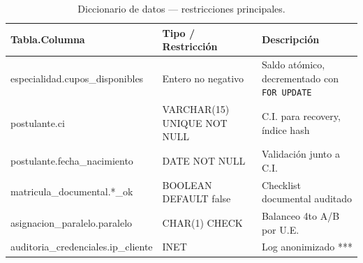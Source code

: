 \begin{table}[htbp]
    \centering
    \caption{Diccionario de datos — restricciones principales.}
    \label{tab:diccionario_datos}
    \small
    \begin{tabularx}{\textwidth}{L L L}
        \toprule
        \textbf{Tabla.Columna} & \textbf{Tipo / Restricción} & \textbf{Descripción} \\
        \midrule
        especialidad.cupos\_disponibles & Entero no negativo & Saldo atómico, decrementado con \texttt{FOR UPDATE} \\
        postulante.ci & VARCHAR(15) UNIQUE NOT NULL & C.I. para recovery, índice hash \\
        postulante.fecha\_nacimiento & DATE NOT NULL & Validación junto a C.I. \\
        matricula\_documental.*\_ok & BOOLEAN DEFAULT false & Checklist documental auditado \\
        asignacion\_paralelo.paralelo & CHAR(1) CHECK & Balanceo 4to A/B por U.E. \\
        auditoria\_credenciales.ip\_cliente & INET & Log anonimizado *** \\
        \bottomrule
    \end{tabularx}
\end{table}

